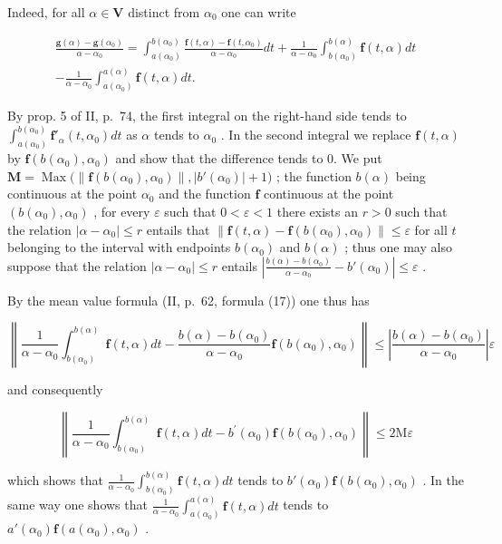 Indeed, for all \(\alpha \in \mathbf{V}\) distinct from \(\alpha_0\) one can write

\[
\begin{array}{c} \frac {\mathbf {g} (\alpha) - \mathbf {g} (\alpha_ {0})}{\alpha - \alpha_ {0}} = \int_ {a (\alpha_ {0})} ^ {b (\alpha_ {0})} \frac {\mathbf {f} (t , \alpha) - \mathbf {f} (t , \alpha_ {0})}{\alpha - \alpha_ {0}} d t + \frac {1}{\alpha - \alpha_ {0}} \int_ {b (\alpha_ {0})} ^ {b (\alpha)} \mathbf {f} (t, \alpha) d t \\ - \frac {1}{\alpha - \alpha_ {0}} \int_ {a (\alpha_ {0})} ^ {a (\alpha)} \mathbf {f} (t, \alpha) d t. \end{array}
\]

By prop. 5 of II, p.~74, the first integral on the right-hand side tends to \(\int_{a(\alpha_0)}^{b(\alpha_0)} \mathbf{f}'_\alpha(t, \alpha_0) dt\) as \(\alpha\) tends to \(\alpha_0\) . In the second integral we replace \(\mathbf{f}(t, \alpha)\) by \(\mathbf{f}(b(\alpha_0), \alpha_0)\) and show that the difference tends to 0. We put \(\mathbf{M} = \operatorname{Max}\big( \| \mathbf{f}(b(\alpha_0), \alpha_0) \|, |b'(\alpha_0)| + 1 \big)\) ; the function \(b(\alpha)\) being continuous at the point \(\alpha_0\) and the function \(\mathbf{f}\) continuous at the point \((b(\alpha_0), \alpha_0)\) , for every \(\varepsilon\) such that \(0 < \varepsilon < 1\) there exists an \(r > 0\) such that the relation \(|\alpha - \alpha_0| \leqslant r\) entails that \(\| \mathbf{f}(t, \alpha) - \mathbf{f}(b(\alpha_0), \alpha_0) \| \leqslant \varepsilon\) for all \(t\) belonging to the interval with endpoints \(b(\alpha_0)\) and \(b(\alpha)\) ; thus one may also suppose that the relation \(|\alpha - \alpha_0| \leqslant r\) entails \(\left| \frac{b(\alpha) - b(\alpha_0)}{\alpha - \alpha_0} - b'(\alpha_0) \right| \leqslant \varepsilon\) .

By the mean value formula (II, p.~62, formula (17)) one thus has

\[
\left\| \frac {1}{\alpha - \alpha_ {0}} \int_ {b (\alpha_ {0})} ^ {b (\alpha)} \mathbf {f} (t, \alpha) d t - \frac {b (\alpha) - b (\alpha_ {0})}{\alpha - \alpha_ {0}} \mathbf {f} (b (\alpha_ {0}), \alpha_ {0}) \right\| \leqslant \left| \frac {b (\alpha) - b (\alpha_ {0})}{\alpha - \alpha_ {0}} \right| \varepsilon
\]

and consequently

\[
\left\| \frac {1}{\alpha - \alpha_ {0}} \int_ {b (\alpha_ {0})} ^ {b (\alpha)} \mathbf {f} (t, \alpha) d t - b ^ {\prime} (\alpha_ {0}) \mathbf {f} (b (\alpha_ {0}), \alpha_ {0}) \right\| \leqslant 2 \mathrm{M} \varepsilon
\]

which shows that \(\frac{1}{\alpha - \alpha_0} \int_{b(\alpha_0)}^{b(\alpha)} \mathbf{f}(t, \alpha) dt\) tends to \(b'(\alpha_0)\mathbf{f}(b(\alpha_0), \alpha_0)\) . In the same way one shows that \(\frac{1}{\alpha - \alpha_0} \int_{a(\alpha_0)}^{a(\alpha)} \mathbf{f}(t, \alpha) dt\) tends to \(a'(\alpha_0)\mathbf{f}(a(\alpha_0), \alpha_0)\) .

